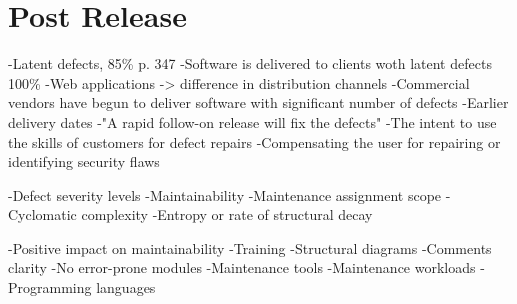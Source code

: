 \section{Post Release}

-Latent defects, 85\% p. 347
-Software is delivered to clients woth latent defects 100\%
-Web applications -> difference in distribution channels
-Commercial vendors have begun to deliver software with significant number of defects
	-Earlier delivery dates
	-"A rapid follow-on release will fix the defects"
	-The intent to use the skills of customers for defect repairs
-Compensating the user for repairing or identifying security flaws

-Defect severity levels
-Maintainability
	-Maintenance assignment scope
	-Cyclomatic complexity
	-Entropy or rate of structural decay

-Positive impact on maintainability
	-Training
	-Structural diagrams
	-Comments clarity
	-No error-prone modules
	-Maintenance tools
	-Maintenance workloads
	-Programming languages